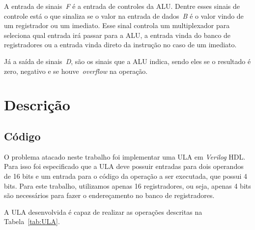 \documentclass[11pt,a4paper,titlepage]{article}
\begin{document}
A entrada de sinais~\textit{F} é a entrada de controles da ALU.
Dentre esses sinais de controle está o que sinaliza se o valor na entrada de dados~\textit{B} é o valor vindo de um registrador ou um imediato.
Esse sinal controla um multiplexador para seleciona qual entrada irá passar para a ALU, a entrada vinda do banco de registradores ou a entrada vinda direto da instrução no caso de um imediato.

Já a saída de sinais~\textit{D}, são os sinais que a ALU indica, sendo eles se o resultado é zero, negativo e se houve~\textit{overflow} na operação.

\section{Descrição}\label{sec:desc}

\subsection{Código}\label{subsec:codigo}

O problema atacado neste trabalho foi implementar uma ULA em \textit{Verilog} HDL.
Para isso foi especificado que a ULA deve possuir entradas para dois operandos de 16 bits e um entrada para o código da operação a ser executada, que possui 4 bits.
Para este trabalho, utilizamos apenas 16 registradores, ou seja, apenas 4 bits são necessários para fazer o endereçamento no banco de registradores.

A ULA desenvolvida é capaz de realizar as operações descritas na Tabela~\ref{tab:ULA}.
\end{document}
